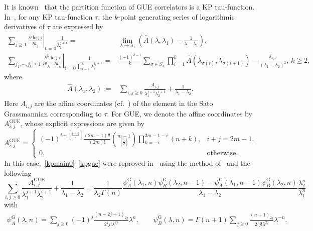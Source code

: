 \documentclass[a4paper]{article}
\theoremstyle{plain}
\theoremstyle{definition}
\begin{document}
It is known~\cite{Shaw} that the partition function of GUE correlators is a KP tau-function. In~\cite{Emergent}, for any KP tau-function $\tau$, the $k$-point generating series of logarithmic derivatives of $\tau$ are expressed by
\begin{align}
	\sum_{j\ge1}\left.\frac{\partial\log\tau}{\partial t_j}\right|_{\mathbf{t}=0}\frac{1}{\lambda_1^{j+1}}=&\lim_{\lambda\to\lambda_1}\left(\widehat A(\lambda,\lambda_1)-\frac{1}{\lambda-\lambda_1}\right),\label{kpmain0}\\
	\sum_{j_1,\cdots,j_k\ge1}\left.\frac{\partial^k\log\tau}{\partial t_{j_1}\cdots\partial t_{j_k}}\right|_{\mathbf{t}=0}\frac{1}{\prod_{i=1}^k\lambda_i^{j_i+1}}=&\frac{(-1)^{k-1}}{k}\sum_{\sigma\in S_k}\prod_{i=1}^k\widehat A(\lambda_{\sigma(i)},\lambda_{\sigma(i+1)})-\frac{\delta_{k,2}}{(\lambda_1-\lambda_2)^2},\,k\ge2,\label{kpmain}
\end{align}
where
\begin{align}
	\widehat A(\lambda_1,\lambda_2):=&\sum_{i,j\ge0}\frac{A_{i,j}}{\lambda_1^{j+1}\lambda_2^{i+1}}+\frac{1}{\lambda_1-\lambda_2}.
\end{align}
Here $A_{i,j}$ are the affine coordinates (cf.~\cite{BY,HE,Sato,ZhouWi,Emergent}) of the element in the Sato Grassmannian corresponding to $\tau$. For GUE, we denote the affine coordinates by $A_{i,j}^{\text{GUE}}$, whose explicit expressions are given by~\cite{Zhou}
\begin{equation}\label{kpgue}
	A_{i,j}^{\text{GUE}}=\begin{cases}
		(-1)^{i+\left[\frac{i+1}{2}\right]}\frac{(2m-1)!!}{(2m)!}\binom{m-1}{\left[\frac{i}{2}\right]}\prod_{k=-i}^{2m-1-i}(n+k),&i+j=2m-1,\\
		0,&\text{otherwise}.
	\end{cases}
\end{equation}
In this case,~\eqref{kpmain0}--\eqref{kpgue} were reproved in~\cite{Toda} using the method of~\cite{DY} and the following
\begin{equation}
	\sum_{i,j\ge0}\frac{A_{i,j}^\text{GUE}}{\lambda_1^{j+1}\lambda_2^{i+1}}+\frac{1}{\lambda_1-\lambda_2}=\frac{1}{\lambda_2\Gamma(n)}\frac{\psi_A^\text{G}(\lambda_1,n)\psi_B^\text{G}(\lambda_2,n-1)-\psi_A^\text{G}(\lambda_1,n-1)\psi_B^\text{G}(\lambda_2,n)}{\lambda_1-\lambda_2}\frac{\lambda_2^n}{\lambda_1^n}
\end{equation}
with
\begin{align}
	\psi_A^\text{G}(\lambda,n)=\sum_{j\ge0}(-1)^j\frac{(n-2j+1)_{2j}}{2^jj!\lambda^{2j}}\lambda^n,\qquad\psi_B^\text{G}(\lambda,n)=\Gamma(n+1)\sum_{j\ge0}\frac{(n+1)_{2j}}{2^jj!\lambda^{2j}}\lambda^{-n}.
\end{align}
\end{document}
